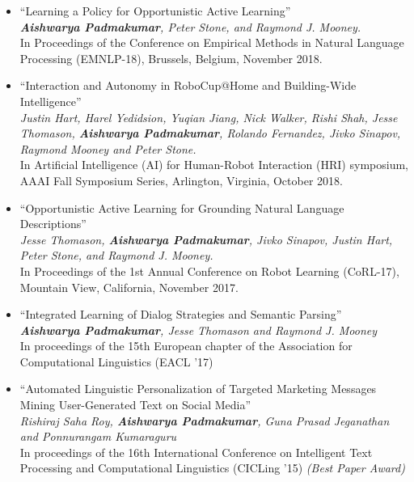 \documentclass[letterpaper,10pt]{resume}
\begin{document}
{\begin{itemize}
\item  ``Learning a Policy for Opportunistic Active Learning'' \\
\textit{\textbf{Aishwarya Padmakumar}, Peter Stone, and Raymond J. Mooney. } \\
In Proceedings of the Conference on Empirical Methods in Natural Language Processing (EMNLP-18), Brussels, Belgium, November 2018. 
\vspace{0.2cm}

\item  ``Interaction and Autonomy in RoboCup@Home and Building-Wide Intelligence'' \\
\textit{Justin Hart, Harel Yedidsion, Yuqian Jiang, Nick Walker, Rishi Shah, Jesse Thomason, \textbf{Aishwarya Padmakumar}, Rolando Fernandez, Jivko Sinapov, Raymond Mooney and Peter Stone. } \\
In Artificial Intelligence (AI) for Human-Robot Interaction (HRI) symposium, AAAI Fall Symposium Series, Arlington, Virginia, October 2018. 
\vspace{0.2cm}

\item  ``Opportunistic Active Learning for Grounding Natural Language Descriptions'' \\
\textit{Jesse Thomason, \textbf{Aishwarya Padmakumar}, Jivko Sinapov, Justin Hart, Peter Stone, and Raymond J. Mooney.} \\
In Proceedings of the 1st Annual Conference on Robot Learning (CoRL-17), Mountain View, California, November 2017. 
\vspace{0.2cm}

\item  ``Integrated Learning of Dialog Strategies and Semantic Parsing'' \\
\textit{\textbf{Aishwarya Padmakumar}, Jesse Thomason and Raymond J. Mooney} \\
In proceedings of the 15th European chapter of the Association for Computational Linguistics (EACL '17) 
\vspace{0.2cm}


\item  ``Automated Linguistic Personalization of Targeted Marketing Messages Mining User-Generated Text on Social Media'' \\
\textit{Rishiraj Saha Roy, \textbf{Aishwarya Padmakumar}, Guna Prasad Jeganathan and Ponnurangam Kumaraguru} \\
In proceedings of the 16th International Conference on Intelligent Text Processing and Computational Linguistics (CICLing ’15) \textit{(Best Paper Award)}
\vspace{0.2cm}


\end{itemize}}
\end{document}
